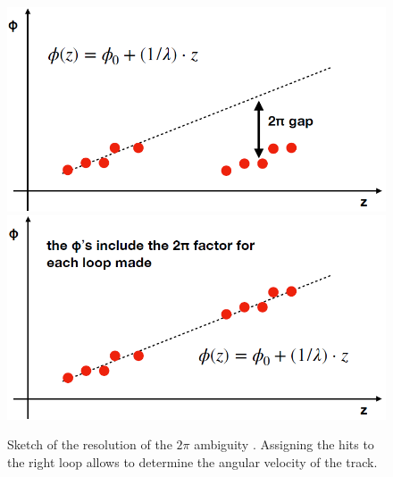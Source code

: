 \documentclass[12pt,a4paper,openright, oneside, titlepage]{book} %
\begin{document}
\begin{figure}[h!]
\centering
\includegraphics[scale=0.55]{giani_TrkPatRec_ambiguity0}
\includegraphics[scale=0.55]{giani_TrkPatRec_ambiguity1}
\caption[Resolution of the $2\pi$ ambiguity]{Sketch of the resolution of the $2\pi$ ambiguity \cite{GianiPatRec:2020}. 
Assigning the hits to the right loop allows to determine the angular velocity of the track.}
\label{_TrkPatRec_ambiguity}
\end{figure}
\end{document}

